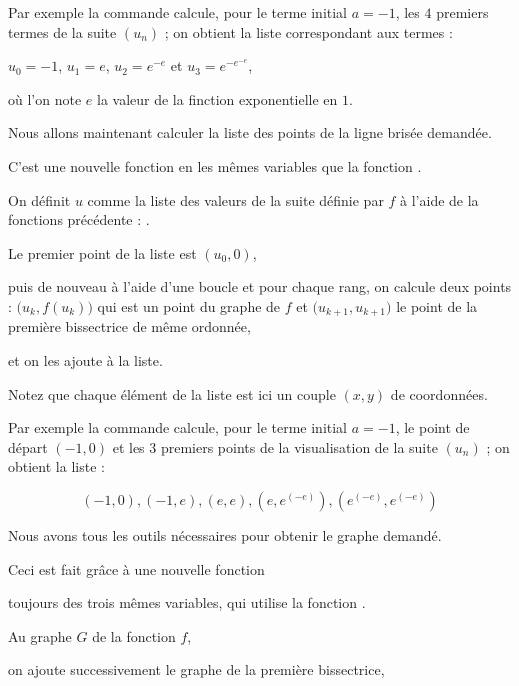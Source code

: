 Par exemple la commande
calcule, pour le terme initial $a=-1$, les $4$ premiers termes de la suite $(u_n)$ ;
on obtient la liste 
correspondant aux termes : 

$u_0=-1$, $u_1 = e$, $u_2 = e^{-e}$ et $u_3 = e^{-e^{-e}}$, 

où l'on note $e$ la valeur de la finction exponentielle en $1$.

\diapo

Nous allons maintenant calculer la liste des points de la ligne brisée demandée.

C'est une nouvelle fonction  en les mêmes variables que la fonction .

On définit $u$ comme la liste des valeurs de la suite définie par $f$ à l'aide de la fonctions précédente : .

Le premier point de la liste est $(u_0,0)$,

puis de nouveau à l'aide d'une boucle et pour chaque rang, on calcule deux points :
$\big(u_k,f(u_k)\big)$ qui est un point du graphe de $f$ et $\big(u_{k+1},u_{k+1}\big)$ le point de la première bissectrice de même ordonnée,

et on les ajoute à la liste.

Notez que chaque élément de la liste est ici un couple $(x,y)$ de
coordonnées.


\change
Par exemple la commande 
calcule, pour le terme initial $a=-1$, le point de départ $(-1,0)$ et les $3$ premiers 
points de la visualisation de la suite $(u_n)$ ;
on obtient la liste :

$$(-1, 0), (-1, e), (e, e), (e, e^(-e)), (e^(-e), e^(-e)) $$



\diapo

Nous avons tous les outils nécessaires pour obtenir le graphe demandé.

\change

Ceci est fait grâce à une nouvelle fonction 

 toujours des trois mêmes variables, qui utilise la fonction .

Au graphe $G$ de la fonction $f$, 

on ajoute successivement le graphe de la première bissectrice, 

